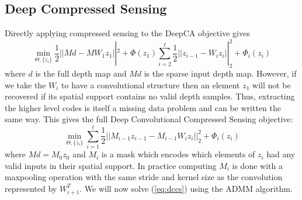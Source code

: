 \subsection{Deep Compressed Sensing}
\label{sec:deep-compr-sens}

Directly applying compressed sensing to the DeepCA objective gives
\begin{equation*}
  \min_{\Theta, \{z_i\}} \frac{1}{2} \left|| Md - MW_1z_1 \right||^2 + \Phi(z_1) \sum_{i=2}^{\ell} \frac{1}{2} \left|| z_{i-1} - W_iz_i\right||_2^2 + \Phi_i(z_i)  
\end{equation*}
where $d$ is the full depth map and $Md$ is the sparse input depth map. However, if we take the $W_i$ to have a convolutional structure then an element $z_1$ will not be recovered if its spatial support contains no valid depth samples. Thus, extracting the higher level codes is itself a missing data problem and can be written the same way. This gives the full Deep Convolutional Compressed Sensing objective:
\begin{equation}
  \label{eq:dccs}
  \min_{\Theta, \{z_i\}} \sum_{i=1}^{\ell} \frac{1}{2} \left|| M_{i-1}z_{i-1} - M_{i-1}W_iz_i\right||_2^2 + \Phi_i(z_i)
\end{equation}
where $Md = M_0z_0$ and $M_i$ is a mask which encodes which elements of $z_i$ had any valid inputs in their spatial support. In practice computing $M_i$ is done with a maxpooling operation with the same stride and kernel size as the convolution represented by $W_{i+1}^T$. We will now solve (\ref{eq:dccs}) using the ADMM algorithm.\\

